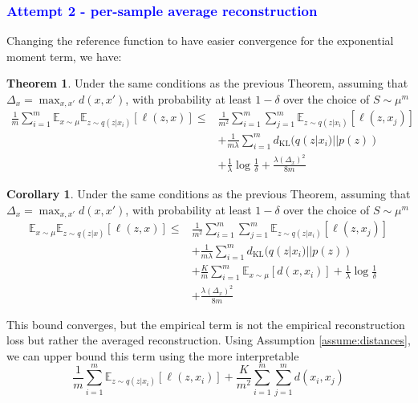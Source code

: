 \documentclass[letterpaper]{article}
\theoremstyle{definition}
\newtheorem{theorem}{Theorem}
\newtheorem{corollary}{Corollary}
\newcommand{\LF}[1]{{\textcolor{blue}{#1}}}
\begin{document}
\LF{\subsubsection{Attempt 2 - per-sample average reconstruction}}

Changing the reference function to have easier convergence for the exponential moment term, we have:

\begin{theorem} \label{thm:stochastic-kernel-sample-average}
    Under the same conditions as the previous Theorem, assuming that $\Delta_x=\max_{x,x'}d(x,x')$, with probability at least $1-\delta$ over the choice of $S\sim \mu^m$
    \begin{equation}
\begin{split}
    \frac{1}{m}\sum_{i=1}^m\mathbb{E}_{x\sim \mu}\mathbb{E}_{z\sim q(z|x_i)}\left [\ell(z,x) \right ]\leq &\frac{1}{m^2}\sum_{i=1}^{m}\sum_{j=1}^{m}\mathbb{E}_{z\sim q(z|x_{i})}\left [\ell(z,x_{j}) \right ]\\
    &+ \frac{1}{m\lambda}\sum_{i=1}^{m}d_{\mathrm{KL}}(q(z|x_{i})||p(z)) \\
    & +\frac{1}{\lambda}\log\frac{1}{\delta} + \frac{\lambda (\Delta_x)^2}{8m}
\end{split}
\end{equation}
\end{theorem}

\begin{corollary}
    Under the same conditions as the previous Theorem, assuming that $\Delta_x=\max_{x,x'}d(x,x')$, with probability at least $1-\delta$ over the choice of $S\sim \mu^m$
    \begin{equation}
\begin{split}
    \mathbb{E}_{x\sim \mu}\mathbb{E}_{z\sim q(z|x)}\left [\ell(z,x) \right ]\leq &\frac{1}{m^2}\sum_{i=1}^{m}\sum_{j=1}^{m}\mathbb{E}_{z\sim q(z|x_{i})}\left [\ell(z,x_{j}) \right ]\\
    &+ \frac{1}{m\lambda}\sum_{i=1}^{m}d_{\mathrm{KL}}(q(z|x_{i})||p(z)) \\
    & + \frac{K}{m}\sum_{i=1}^{m}\mathbb{E}_{x\sim \mu}\left [d(x,x_{i}) \right ]+\frac{1}{\lambda}\log\frac{1}{\delta} \\
    &+ \frac{\lambda (\Delta_x)^2}{8m}
\end{split}
\end{equation}
\end{corollary}

This bound converges, but the empirical term is not the empirical reconstruction loss but rather the averaged reconstruction.
Using Assumption \ref{assume:distances}, we can upper bound this term using the more interpretable $$\frac{1}{m}\sum_{i=1}^{m}\mathbb{E}_{z\sim q(z|x_{i})}\left [\ell(z,x_{i}) \right ]+\frac{K}{m^2}\sum_{i=1}^{m}\sum_{j=1}^{m}d(x_i,x_j)$$
\end{document}
